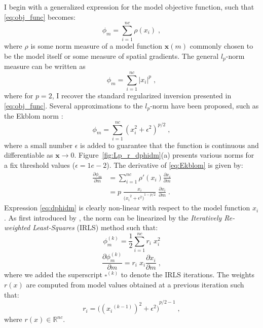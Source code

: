 I begin with a generalized expression for the model objective function, such that \eqref{eq:obj_func} becomes:
\begin{equation} \label{eq:lpnorm}
\phi_m = \sum_{i=1}^{nc} \rho ( x_i ) \; ,
\end{equation}
where $\rho$ is some norm measure of a model function $\mathbf{x}(m)$ commonly chosen to be the model itself or some measure of spatial gradients. 
The general $l_p$-norm measure can be written as
\begin{equation} \label{eq:lpnorm}
\phi_m = \sum_{i=1}^{nc} {|x_i|}^p \;,
\end{equation}
where for $p=2$, I recover the standard regularized inversion presented in \eqref{eq:obj_func}.
Several approximations to the $l_p$-norm have been proposed, such as the Ekblom norm \cite[]{Ekblom73}: 
\begin{equation} \label{eq:Ekblom}
\phi_m =  \sum_{i=1}^{nc} {(x_i^2 + \epsilon^2)}^{p/2} \;,
\end{equation}
where a small number $\epsilon$ is added to guarantee that the function is continuous and differentiable as $\mathbf{x} \rightarrow 0$. 
Figure~\ref{fig:Lp_r_dphidm}(a) presents various norms for a fix threshold values ($\epsilon=1e-2$).
 The derivative of \eqref{eq:Ekblom} is given by:
\begin{equation} \label{eq:dphidm}
\begin{split}
\frac{\partial \phi_m}{\partial m} &= \sum_{i=1}^{nc} \rho'(x_i)  \frac{\partial x_i}{\partial m} \\
 &= p \;\frac{x_i}{{{(x_i}^{2} + \epsilon^2 )}^{1-p/2}}  \;  \frac{\partial x_i}{\partial m} \;.
\end{split}
\end{equation}
Expression \eqref{eq:dphidm} is clearly non-linear with respect to the model function $x_i$. 
As first introduced by \cite{Lawson61}, the norm can be linearized by the \emph{Iteratively Re-weighted Least-Squares} (IRLS) method such that:
 \begin{equation} \label{eq:IRLS_phi}
\phi_m^{(k)} =  \frac{1}{2}\sum_{i=1}^{nc} r_i \; x_i^2
\end{equation}
\begin{equation}\label{eq:IRLS_dphidm}
	\frac{\partial \phi_m^{(k)}}{\partial m}  =   r_i \; x_i \frac{\partial x_i}{\partial m} \;,
\end{equation}
where we added the superscript $\square^{(k)}$ to denote the IRLS iterations. The weights $r(x)$ are computed from model values obtained at a previous iteration such that:
\begin{equation}\label{eq:R_w}
	{r}_i  ={\Big( {({x_i}^{(k-1)})}^{2} + \epsilon^2 \Big)}^{p/2 - 1} \;,
\end{equation}
where ${r}(x) \in \mathbb{R}^{nc}$.

